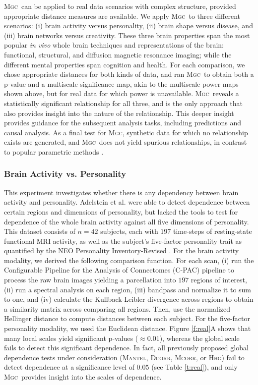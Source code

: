 \documentclass[11pt]{article}
\providecommand{\sct}[1]{{\normalfont\textsc{#1}}}
\newcommand{\Mgc}{\sct{Mgc}}
\newcommand{\Hhg}{\sct{Hhg}}
\newcommand{\Dcorr}{\sct{Dcorr}}
\newcommand{\Mcorr}{\sct{Mcorr}}
\newcommand{\Mantel}{\sct{Mantel}}
\begin{document}
\Mgc~can be applied to real data scenarios with complex structure, provided appropriate distance measures are available. We apply \Mgc~to three different scenarios: (i) brain activity versus personality, (ii) brain shape versus disease, and (iii) brain networks versus creativity.  These three brain properties span the most popular \emph{in vivo} whole brain techniques and representations of the brain: functional, structural, and diffusion magnetic resonance imaging; while the different mental properties span cognition and health.  For each comparison, we chose appropriate distances for both kinds of data, and ran \Mgc~to obtain both a p-value and a multiscale significance map, akin to the multiscale power maps shown above, but for real data for which power is unavailable. \Mgc~reveals a statistically significant relationship for all three, and is the only approach that also provides insight into the nature of the relationship. 
This deeper insight provides guidance for the subsequent analysis tasks, including predictions and causal analysis. As a final test for \Mgc, synthetic data for which no relationship exists are generated, and \Mgc~does not yield spurious relationships, in contrast to popular parametric methods \cite{EklundKnutsson2012,Eklund2015}. 


\subsubsection*{Brain Activity vs. Personality} 

This experiment investigates whether there is any dependency between brain activity and personality.
Adelstein et al. \cite{AdelsteinEtAl2011} were able to detect dependence between certain regions and dimensions of personality, but lacked the tools to test for dependence of the whole brain activity against all five dimensions of personality. 
This dataset consists of $n=42$ subjects, each with  $197$ time-steps of resting-state functional MRI activity, as well as the subject's five-factor personality trait as quantified by  the NEO Personality Inventory-Revised  \cite{Costa1992}. 
For the brain activity modality, we derived the following comparison function. For each scan, (i) 
run the Configurable Pipeline for the Analysis of Connectomes (C-PAC) pipeline \cite{CPAC2015} to process the raw brain images yielding a parcellation into $197$ regions of interest, 
(ii) run a spectral analysis on each region, (iii) bandpass and normalize it to sum to one, and (iv) calculate the Kullback-Leibler divergence across regions to obtain a similarity matrix across comparing all regions.  Then, use the normalized Hellinger distance to compute distances between each subject. 
For the five-factor personality modality, we  used the Euclidean distance.
% 
Figure \ref{f:real}{\color{magenta}A}  shows that many local scales yield significant p-values ($\approx 0.01$), whereas the global scale fails to detect this significant dependence. In fact, all previously proposed global dependence tests under consideration (\Mantel, \Dcorr, \Mcorr, or \Hhg) fail to detect dependence at a significance level of $0.05$ (see Table \ref{t:real}), and only \Mgc~provides insight into the scales of dependence.
\end{document}
